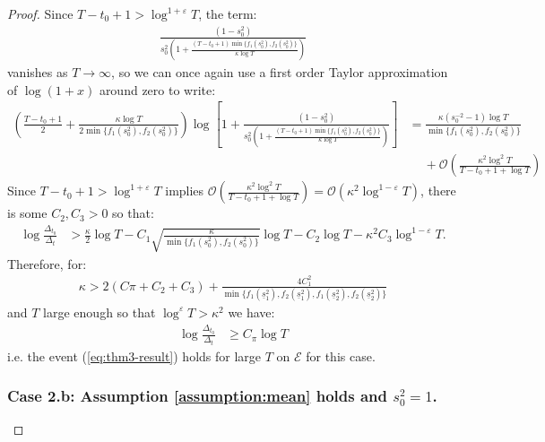\begin{proof}
Since $T-t_0+1 > \log^{1+\varepsilon} T$, the term:
\begin{align*}
    \frac{(1 - s_0^2)}{s_0^{2}\left(1+ \frac{(T-t_0+1)\min\{f_1(s_0^2), f_2(s_0^2)\}}{\kappa \log T}\right)}
\end{align*}
vanishes as $T \to \infty$, so we can once again use a first order Taylor approximation of $\log(1+x)$ around zero to write:
\small
\begin{align*}
     \left(\frac{T - t_0 +1}{2} + \frac{\kappa \log T}{2\min\{f_1(s_0^2), f_2(s_0^2)\}}\right)\log\left[1 + \frac{(1 - s_0^2)}{s_0^{2}\left(1+ \frac{(T-t_0+1)\min\{f_1(s_0^2), f_2(s_0^2)\}}{\kappa \log T}\right)}\right]  &=  \frac{\kappa (s_0^{-2} -1) \log T}{\min\{f_1(s_0^2), f_2(s_0^2)\}} \\
     &\quad\: + \mathcal{O}\left(\frac{\kappa^2\log^2 T}{T-t_0+1 + \log T}\right)
\end{align*}
\normalsize
Since $T-t_0+1 > \log^{1+\varepsilon} T$ implies $\mathcal{O}\left(\frac{\kappa^2\log^2 T}{T-t_0+1 + \log T}\right) = \mathcal{O}(\kappa^2\log^{1-\varepsilon} T)$, there is some $C_2,C_3 > 0$ so that: 
\small
\begin{align*}
    \log \frac{\Delta_{t_0}}{\Delta_t} &> \frac{\kappa }{2}\log T- C_1\sqrt{\frac{\kappa}{\min\{f_1(s_0^2), f_2(s_0^2)\}}} \log T   - C_2\log T - \kappa^2C_3\log^{1-\varepsilon} T. 
\end{align*}
\normalsize
Therefore, for:
\begin{align*}
    \kappa > 2(C\pi + C_2 + C_3) + \frac{4C_1^2}{\min\{f_1(\underline{s}_1^2), f_2(\underline{s}_1^2),f_1(\underline{s}_2^2), f_2(\underline{s}_2^2)\}}
\end{align*}
and $T$ large enough so that $\log^{\varepsilon} T > \kappa^2 $ we have:
\begin{align*}
    \log \frac{\Delta_{t_0}}{\Delta_t} &\geq C_\pi \log T
\end{align*}
i.e. the event (\ref{eq:thm3-result}) holds for large $T$ on $\mathcal{E}$ for this case. 

\subsubsection*{Case 2.b: Assumption \ref{assumption:mean} holds and $s_0^2 =1$.}


\end{proof}
